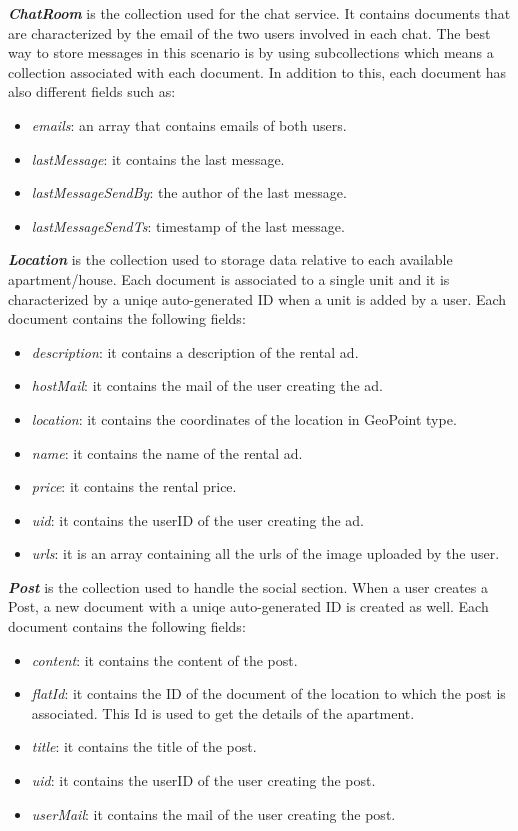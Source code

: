 \textbf{\textit{ChatRoom}} is the collection used for the chat service. It contains documents that are characterized by the email of the two users involved in each chat. The best way to store messages in this scenario is by using subcollections which means a collection associated with each document. In addition to this, each document has also different fields such as:
\begin{itemize}
    \item \textit{emails}: an array that contains emails of both users.
    \item \textit{lastMessage}: it contains the last message.
    \item \textit{lastMessageSendBy}: the author of the last message.
    \item \textit{lastMessageSendTs}: timestamp of the last message.\\
\end{itemize}

\textbf{\textit{Location}} is the collection used to storage data relative to each available apartment/house. Each document is associated to a single unit and it is characterized by a uniqe auto-generated ID when a unit is added by a user. Each document contains the following fields: 
\begin{itemize}
    \item \textit{description}: it contains a description of the rental ad.
    \item \textit{hostMail}: it contains the mail of the user creating the ad.
    \item \textit{location}: it contains the coordinates of the location in GeoPoint type.
    \item \textit{name}: it contains the name of the rental ad.
    \item \textit{price}: it contains the rental price.
    \item \textit{uid}: it contains the userID of the user creating the ad.
    \item \textit{urls}: it is an array containing all the urls of the image uploaded by the user.\\
\end{itemize}

\textbf{\textit{Post}} is the collection used to handle the social section. When a user creates a Post, a new document with a uniqe auto-generated ID is created as well.  Each document contains the following fields:
\begin{itemize}
    \item \textit{content}: it contains the content of the post. 
    \item \textit{flatId}: it contains the ID of the document of the location to which the post is associated. This Id is used to get the details of the apartment.
    \item \textit{title}: it contains the title of the post.
    \item \textit{uid}: it contains the userID of the user creating the post.
    \item \textit{userMail}: it contains the mail of the user creating the post.\\
\end{itemize}

